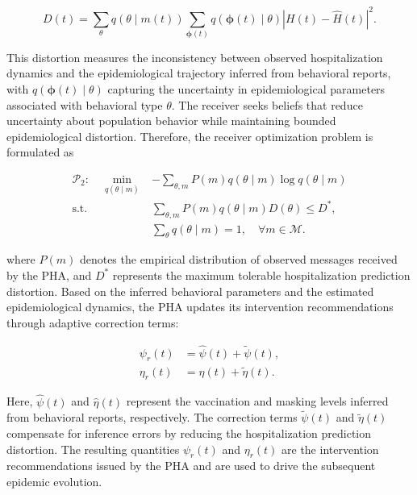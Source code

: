 \documentclass[sigconf,review]{acmart}
\begin{document}
\begin{equation}
D(t)
=
\sum_{\theta}
q(\theta\mid m(t))
\sum_{\boldsymbol{\phi}(t)}
q(\boldsymbol{\phi}(t)\mid\theta)
\left|
H(t)-\widehat H(t)
\right|^2 .
\label{eq_error}
\end{equation}

This distortion measures the inconsistency between observed hospitalization dynamics and the epidemiological trajectory inferred
from behavioral reports, with
$q(\boldsymbol{\phi}(t)\mid\theta)$ capturing the uncertainty in
epidemiological parameters associated with behavioral type $\theta$.
The receiver seeks beliefs that reduce uncertainty about population
behavior while maintaining bounded epidemiological distortion. Therefore,
the receiver optimization problem is formulated as

\begin{equation}
\begin{aligned}
\mathcal{P}_2:
\quad
\min_{q(\theta\mid m)}
&
-
\sum_{\theta,m}
P(m)
q(\theta\mid m)
\log q(\theta\mid m)
\\
\text{s.t.}
&
\sum_{\theta,m}
P(m)
q(\theta\mid m)
D(\theta)
\leq D^*,
\\
&
\sum_{\theta}
q(\theta\mid m)=1,
\quad
\forall m\in\mathcal M .
\end{aligned}
\label{eq:P2}
\end{equation}

where $P(m)$ denotes the empirical distribution of observed messages received by the PHA, and $D^*$ represents the maximum tolerable
hospitalization prediction distortion.
Based on the inferred behavioral parameters and the estimated epidemiological dynamics, the PHA updates its intervention recommendations through adaptive correction terms:

\begin{align}
\psi_r(t)
&=
\widehat{\psi}(t)
+
\widetilde{\psi}(t),
\\
\eta_r(t)
&=
\widehat{\eta}(t)
+
\widetilde{\eta}(t).
\label{eq:combined_params}
\end{align}

Here, $\widehat{\psi}(t)$ and $\widehat{\eta}(t)$ represent the vaccination and masking levels inferred from behavioral reports,
respectively. The correction terms
$\widetilde{\psi}(t)$ and $\widetilde{\eta}(t)$ compensate for inference errors by reducing the hospitalization prediction distortion. The
resulting quantities $\psi_r(t)$ and $\eta_r(t)$ are the intervention recommendations issued by the PHA and are used to drive the subsequent epidemic evolution.
\end{document}
